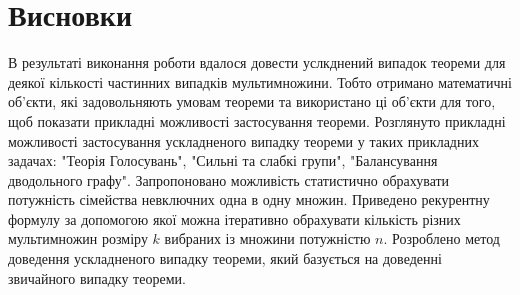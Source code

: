 \chapter*{Висновки}

В результаті виконання роботи вдалося довести услкднений випадок теореми для деякої кількості частинних випадків мультимножини. Тобто отримано математичні об'єкти, які задовольняють умовам теореми та використано ці об'єкти для того, щоб показати прикладні можливості застосування теореми. Розглянуто прикладні можливості застосування ускладненого випадку теореми у таких прикладних задачах: "Теорія Голосувань", "Сильні та слабкі групи", "Балансування дводольного графу". Запропоновано можливість статистично обрахувати потужність сімейства невключних одна в одну множин. Приведено рекурентну формулу за допомогою якої можна ітеративно обрахувати кількість різних мультимножин розміру $k$ вибраних із множини потужністю $n$. Розроблено метод доведення ускладненого випадку теореми, який базується на доведенні звичайного випадку теореми.
